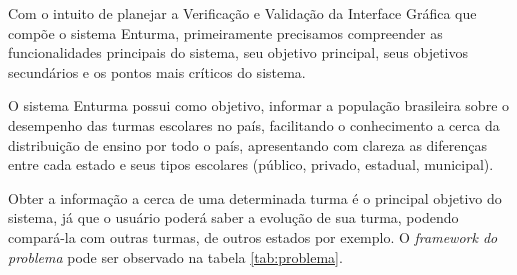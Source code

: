 
Com o intuito de planejar a Verificação e Validação da Interface Gráfica que compõe o sistema Enturma, primeiramente precisamos compreender as funcionalidades principais do sistema, seu objetivo principal, seus objetivos secundários e os pontos mais críticos do sistema.

O sistema Enturma possui como objetivo, informar a população brasileira sobre o desempenho das turmas escolares no país, facilitando o conhecimento a cerca da distribuição de ensino por todo o país, apresentando com clareza as diferenças entre cada estado e seus tipos escolares (público, privado, estadual, municipal). 

Obter a informação a cerca de uma determinada turma é o principal objetivo do sistema, já que o usuário poderá saber a evolução de sua turma, podendo compará-la com outras turmas, de outros estados por exemplo. O \textit{framework do problema} pode ser observado na tabela \ref{tab:problema}.


